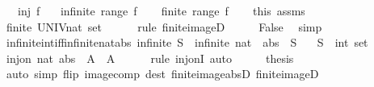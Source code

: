 \begin{isabellebody}
\ \ \ {\isachardoublequoteopen}inj\ f{\isachardoublequoteclose}\isanewline
\ \ \ {\isachardoublequoteopen}infinite\ {\isacharparenleft}range\ f{\isacharparenright}{\isachardoublequoteclose}\isanewline
%
\isadelimproof
%
\endisadelimproof
%
\isatagproof
{}\isamarkupfalse%
\isanewline
\ \ \isamarkupfalse%
\ {\isachardoublequoteopen}finite\ {\isacharparenleft}range\ f{\isacharparenright}{\isachardoublequoteclose}\isanewline
\ \ \isamarkupfalse%
\ this\ assms\ \isamarkupfalse%
\ {\isachardoublequoteopen}finite\ {\isacharparenleft}UNIV{\isacharcolon}{\isacharcolon}nat\ set{\isacharparenright}{\isachardoublequoteclose}\isanewline
\ \ \ \ \isamarkupfalse%
\ {\isacharparenleft}rule\ finite{\isacharunderscore}imageD{\isacharparenright}\isanewline
\ \ \isamarkupfalse%
\ \isamarkupfalse%
\ False\ \isamarkupfalse%
\ simp\isanewline
{}\isamarkupfalse%
%
\endisatagproof
{\isafoldproof}%
%
\isadelimproof
%
\endisadelimproof
%
\isadelimdocument
%
\endisadelimdocument
%
\isatagdocument
%
\isamarkuptrue%
%
\endisatagdocument
{\isafolddocument}%
%
\isadelimdocument
%
\endisadelimdocument
{}\isamarkupfalse%
\ infinite{\isacharunderscore}int{\isacharunderscore}iff{\isacharunderscore}infinite{\isacharunderscore}nat{\isacharunderscore}abs{\isacharcolon}\ {\isachardoublequoteopen}infinite\ S\ {\isasymlongleftrightarrow}\ infinite\ {\isacharparenleft}{\isacharparenleft}nat\ {\isasymcirc}\ abs{\isacharparenright}\ {\isacharbackquote}\ S{\isacharparenright}{\isachardoublequoteclose}\isanewline
\ \ \ S\ {\isacharcolon}{\isacharcolon}\ {\isachardoublequoteopen}int\ set{\isachardoublequoteclose}\isanewline
%
\isadelimproof
%
\endisadelimproof
%
\isatagproof
{}\isamarkupfalse%
\ {\isacharminus}\isanewline
\ \ \isamarkupfalse%
\ {\isachardoublequoteopen}inj{\isacharunderscore}on\ nat\ {\isacharparenleft}abs\ {\isacharbackquote}\ A{\isacharparenright}{\isachardoublequoteclose}\ \ A\isanewline
\ \ \ \ \isamarkupfalse%
\ {\isacharparenleft}rule\ inj{\isacharunderscore}onI{\isacharparenright}\ auto\isanewline
\ \ \isamarkupfalse%
\ \isamarkupfalse%
\ {\isacharquery}thesis\isanewline
\ \ \ \ \isamarkupfalse%
\ {\isacharparenleft}auto\ simp\ flip{\isacharcolon}\ image{\isacharunderscore}comp\ dest{\isacharcolon}\ finite{\isacharunderscore}image{\isacharunderscore}absD\ finite{\isacharunderscore}imageD{\isacharparenright}\isanewline

\end{isabellebody}
